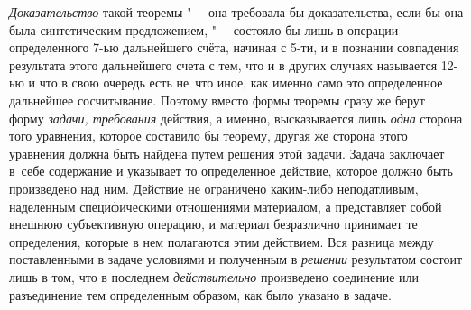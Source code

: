 {\em Доказательство} такой теоремы "--- она требовала бы доказательства, если
бы она была синтетическим предложением, "--- состояло бы лишь в операции
определенного 7-ью дальнейшего счёта, начиная с 5-ти, и в познании
совпадения результата этого дальнейшего счета с тем, что и в других случаях
называется 12-ью и что в свою очередь есть не~что иное, как именно само это
определенное дальнейшее сосчитывание. Поэтому вместо формы теоремы сразу же
берут форму {\em задачи, требования} действия,
а именно, высказывается лишь {\em одна}
сторона того уравнения, которое составило бы теорему, другая
же сторона этого уравнения должна быть найдена путем решения этой задачи.
Задача заключает в~себе содержание и указывает то определенное действие,
которое должно быть произведено над ним. Действие не ограничено каким-либо
неподатливым, наделенным специфическими отношениями материалом, а
представляет собой внешнюю субъективную операцию, и материал безразлично
принимает те определения, которые в нем полагаются этим действием. Вся
разница между поставленными в задаче условиями и полученным в {\em решении}
результатом состоит лишь в том, что в последнем {\em действительно}
произведено соединение или разъединение тем определенным
образом, как было указано в задаче.

